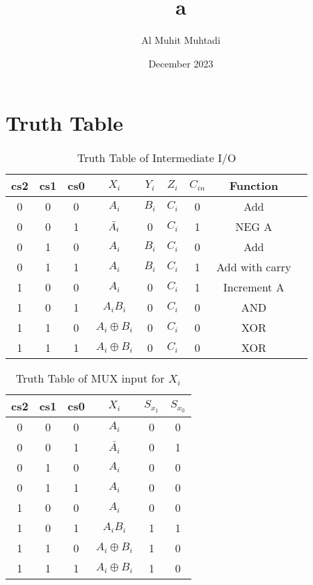 \documentclass{article}
\title{a}
\author{Al Muhit Muhtadi}
\date{December 2023}
\begin{document}
\maketitle

\section{\large{Truth Table}}

\begin{table}[H]
    \centering
    \begin{tabular}{|c|c|c|c|c|c|c|c|c|}
    \hline
         cs2 & cs1 & cs0 & $X_{i}$ & $Y_i$ & $Z_{i}$ & $C_{in}$ & Function  \\
         \hline
         0 & 0 & 0 & $A_{i}$ & $B_{i}$ & $C_{i}$ & 0 & Add \\
         0 & 0 & 1 & $\Bar{A_i}$ & 0 & $C_i$ & 1 & NEG A \\
         0 & 1 & 0 & $A_{i}$ & $B_{i}$ & $C_{i}$ & 0 & Add \\
         0 & 1 & 1 & $A_{i}$ & $B_{i}$ & $C_{i}$ & 1 & Add with carry \\
         1 & 0 & 0 & $A_i$ & 0 & $C_i$ & 1 & Increment A \\
         1 & 0 & 1 & $A_{i}B_{i}$ & 0 & $C_i$ & 0 & AND \\
         1 & 1 & 0 & $A_i \oplus B_i$ & 0 & $C_i$ & 0 & XOR \\
         1 & 1 & 1 & $A_i \oplus B_i$ & 0 & $C_i$ & 0 & XOR \\
         \hline
    \end{tabular}
    \caption{Truth Table of Intermediate I/O}
    \label{tab:truth_table1}
\end{table}
\begin{table}[H]
    \centering
    \begin{tabular}{|c|c|c|c|c|c|}
    \hline
         cs2 & cs1 & cs0 & $X_{i}$ & $S_{x_1}$ & $S_{x_0}$  \\
         \hline
         0 & 0 & 0 & $A_{i}$ & 0 & 0 \\
         0 & 0 & 1 & $\bar{A_i}$ & 0 & 1 \\
         0 & 1 & 0 & $A_{i}$ & 0 & 0 \\
         0 & 1 & 1 & $A_{i}$ & 0 & 0 \\
         1 & 0 & 0 & $A_i$ & 0 & 0\\
         1 & 0 & 1 & $A_{i}B_{i}$ & 1 & 1\\
         1 & 1 & 0 & $A_i \oplus B_i$ & 1 & 0 \\
         1 & 1 & 1 & $A_i \oplus B_i$ & 1 & 0 \\
         \hline
    \end{tabular}
    \caption{Truth Table of MUX input for $X_i$}
    \label{tab:truth_table2}
\end{table}
\end{document}
